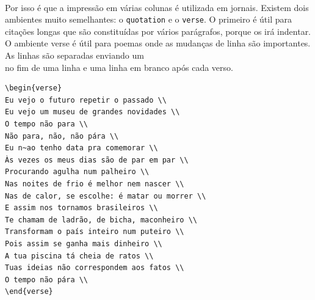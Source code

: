\documentclass[a4paper,10pt]{report}
\begin{document}
\paragraph{}
Por isso é que a impressão em várias colunas é utilizada em jornais.
Existem dois ambientes muito semelhantes: o \verb|quotation| e o \verb|verse|. O
primeiro é útil para citações longas que são constituídas por vários parágrafos,
porque os irá indentar. O ambiente verse é útil para poemas onde as mudanças
de linha são importantes. As linhas são separadas enviando um \\ no fim de
uma linha e uma linha em branco após cada verso.
\begin{verbatim}
\begin{verse}
Eu vejo o futuro repetir o passado \\
Eu vejo um museu de grandes novidades \\
O tempo não para \\
Não para, não, não pára \\
Eu n~ao tenho data pra comemorar \\
Às vezes os meus dias são de par em par \\
Procurando agulha num palheiro \\
Nas noites de frio é melhor nem nascer \\
Nas de calor, se escolhe: é matar ou morrer \\
E assim nos tornamos brasileiros \\
Te chamam de ladrão, de bicha, maconheiro \\
Transformam o país inteiro num puteiro \\
Pois assim se ganha mais dinheiro \\
A tua piscina tá cheia de ratos \\
Tuas ideias não correspondem aos fatos \\
O tempo não pára \\
\end{verse}
\end{verbatim}
\end{document}
